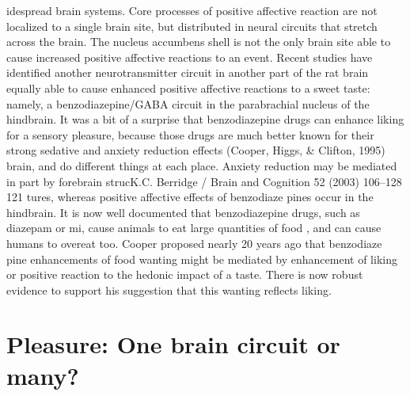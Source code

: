 \documentclass[conference]{IEEEtran}
\begin{document}
idespread brain systems. Core processes of positive
affective reaction are not localized to a single brain site,
but distributed in neural circuits that stretch across the
brain. The nucleus accumbens shell is not the only brain
site able to cause increased positive affective reactions to
an event. Recent studies have identified another neurotransmitter circuit in another part of the rat brain
equally able to cause enhanced positive affective reactions to a sweet taste: namely, a benzodiazepine/GABA
circuit in the parabrachial nucleus of the hindbrain.
It was a bit of a surprise that benzodiazepine drugs
can enhance liking for a sensory pleasure, because
those drugs are much better known for their strong
sedative and anxiety reduction effects (Cooper, Higgs, \& Clifton, 1995) brain, and do different things at each place. Anxiety
reduction may be mediated in part by forebrain strucK.C. Berridge / Brain and Cognition 52 (2003) 106–128 121
tures, whereas positive affective effects of benzodiaze pines occur in the hindbrain. It is now well documented
that benzodiazepine drugs, such as diazepam or mi, cause animals to eat large quantities of food , and can cause humans to
overeat too. Cooper proposed nearly 20 years ago that benzodiaze pine enhancements of food wanting might be mediated
by enhancement of liking or positive reaction to the
hedonic impact of a taste. There
is now robust evidence to support his suggestion that
this wanting reflects liking.



\section{Pleasure: One brain circuit or many?}
\end{document}

